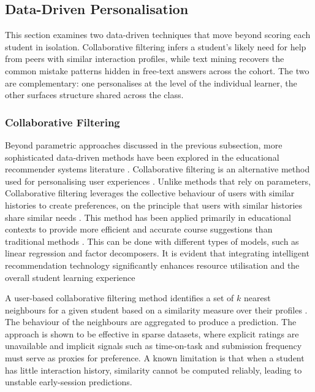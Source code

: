 \subsection{Data-Driven Personalisation}

This section examines two data-driven techniques that move beyond scoring each student in isolation. 
Collaborative filtering infers a student's likely need for help from peers with similar interaction profiles, while text mining recovers the common mistake patterns hidden in free-text answers across the cohort. 
The two are complementary: one personalises at the level of the individual learner, the other surfaces structure shared across the class.



\subsubsection{Collaborative Filtering}

Beyond parametric approaches discussed in the previous subsection, more sophisticated data-driven methods have been explored in the educational recommender systems literature \cite{dasilva_2022_a, deschnes_2020_recommender}.
Collaborative filtering is an alternative method used for personalising user experiences \cite{resnickGroupLensOpenArchitecture1994}.
Unlike methods that rely on parameters, Collaborative filtering leverages the collective behaviour of users with similar histories to create preferences, on the principle that users with similar histories share similar needs \cite{schafer_2007_collaborative}. This method has been applied primarily in educational contexts to provide more efficient and accurate course suggestions than traditional methods \cite{li_2020_course}. This can be done with different types of models, such as linear regression and factor decomposers. It is evident that integrating intelligent recommendation technology significantly enhances resource utilisation and the overall student learning experience

A user-based collaborative filtering method identifies a set of $k$ nearest neighbours for a given student based on a similarity measure over their profiles \cite{herlockerAlgorithmicFrameworkPerforming1999}. The behaviour of the neighbours are aggregated to produce a prediction. The approach is shown to be effective in sparse datasets, where explicit ratings are unavailable and implicit signals such as time-on-task and submission frequency must serve as proxies for preference. A known limitation is that when a student has little interaction history, similarity cannot be computed reliably, leading to unstable early-session predictions.

